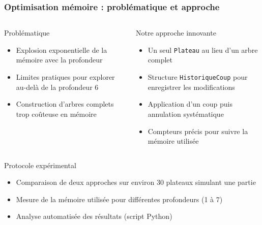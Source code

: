 \documentclass{beamer}
\begin{document}
\begin{frame}
    \frametitle{Optimisation mémoire : problématique et approche}
    
    \begin{columns}
        \begin{column}{0.48\textwidth}
            \begin{block}{Problématique}
            \scriptsize
            \begin{itemize}
                \item Explosion exponentielle de la mémoire avec la profondeur
                \item Limites pratiques pour explorer au-delà de la profondeur 6
                \item Construction d'arbres complets trop coûteuse en mémoire
            \end{itemize}
            \end{block}
        \end{column}
        \begin{column}{0.48\textwidth}
            \begin{block}{Notre approche innovante}
            \scriptsize
            \begin{itemize}
                \item Un seul \texttt{Plateau} au lieu d'un arbre complet
                \item Structure \texttt{HistoriqueCoup} pour enregistrer les modifications
                \item Application d'un coup puis annulation systématique
                \item Compteurs précis pour suivre la mémoire utilisée
            \end{itemize}
            \end{block}
        \end{column}
    \end{columns}
    
    \begin{block}{Protocole expérimental}
    \scriptsize
    \begin{itemize}
        \item Comparaison de deux approches sur environ 30 plateaux simulant une partie
        \item Mesure de la mémoire utilisée pour différentes profondeurs (1 à 7)
        \item Analyse automatisée des résultats (script Python)
    \end{itemize}
    \end{block}
\end{frame}
\end{document}
